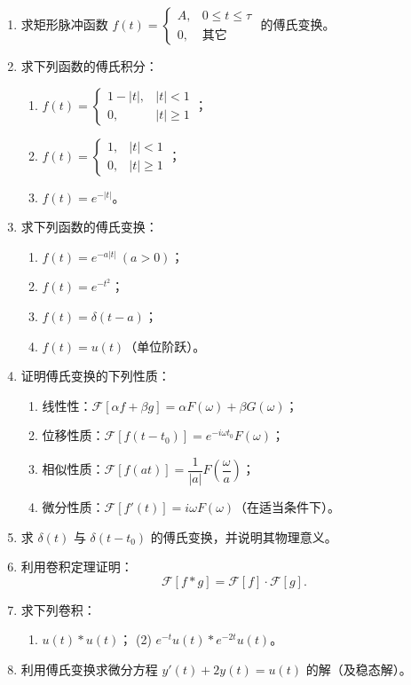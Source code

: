 \begin{enumerate}
\def\labelenumi{\arabic{enumi}.}
\item
  求矩形脉冲函数
  \(f(t)=\begin{cases}A,&0\le t\le\tau\\0,&\text{其它}\end{cases}\)
  的傅氏变换。
\item
  求下列函数的傅氏积分：

  \begin{enumerate}
  \def\labelenumii{(\arabic{enumii})}
  \tightlist
  \item
    \(f(t)=\begin{cases}1-|t|,&|t|<1\\0,&|t|\ge1\end{cases}\)；
  \item
    \(f(t)=\begin{cases}1,&|t|<1\\0,&|t|\ge1\end{cases}\)；
  \item
    \(f(t)=e^{-|t|}\)。
  \end{enumerate}
\item
  求下列函数的傅氏变换：

  \begin{enumerate}
  \def\labelenumii{(\arabic{enumii})}
  \tightlist
  \item
    \(f(t)=e^{-a|t|}\ (a>0)\)；
  \item
    \(f(t)=e^{-t^2}\)；
  \item
    \(f(t)=\delta(t-a)\)；
  \item
    \(f(t)=u(t)\)（单位阶跃）。
  \end{enumerate}
\item
  证明傅氏变换的下列性质：

  \begin{enumerate}
  \def\labelenumii{(\arabic{enumii})}
  \tightlist
  \item
    线性性：\(\mathcal F[\alpha f+\beta g]=\alpha F(\omega)+\beta G(\omega)\)；
  \item
    位移性质：\(\mathcal F[f(t-t_0)]=e^{-i\omega t_0}F(\omega)\)；
  \item
    相似性质：\(\mathcal F[f(at)]=\dfrac1{|a|}F\left(\dfrac{\omega}{a}\right)\)；
  \item
    微分性质：\(\mathcal F[f'(t)]=i\omega F(\omega)\)（在适当条件下）。
  \end{enumerate}
\item
  求 \(\delta(t)\) 与 \(\delta(t-t_0)\) 的傅氏变换，并说明其物理意义。
\item
  利用卷积定理证明： \[
  \mathcal F[f*g]=\mathcal F[f]\cdot\mathcal F[g].
  \]
\item
  求下列卷积：

  \begin{enumerate}
  \def\labelenumii{(\arabic{enumii})}
  \tightlist
  \item
    \(u(t)*u(t)\)； (2) \(e^{-t}u(t)*e^{-2t}u(t)\)。
  \end{enumerate}
\item
  利用傅氏变换求微分方程 \(y'(t)+2y(t)=u(t)\) 的解（及稳态解）。
\end{enumerate}

